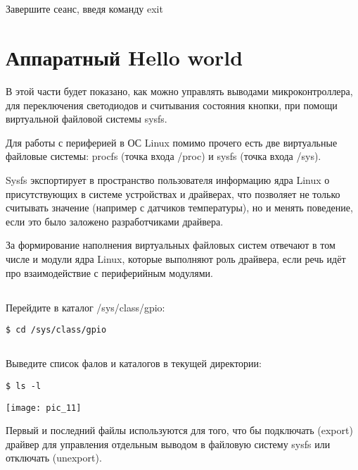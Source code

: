 \subsection{}Завершите сеанс, введя команду exit 

\section{Аппаратный Hello world }

В этой части будет показано, как можно управлять выводами микроконтроллера, для переключения светодиодов и считывания состояния кнопки, при помощи виртуальной файловой системы sysfs.

Для работы с периферией в ОС Linux помимо прочего есть две виртуальные файловые системы: procfs (точка входа /proc) и sysfs (точка входа /sys).  

Sysfs экспортирует в пространство пользователя информацию ядра Linux о присутствующих в системе устройствах и драйверах, что позволяет не только считывать значение (например с датчиков температуры), но и менять поведение, если это было заложено разработчиками драйвера.

За формирование наполнения виртуальных файловых систем отвечают в том числе и модули ядра Linux, которые выполняют роль драйвера, если речь идёт про взаимодействие с периферийным модулями.

\subsection{}Перейдите в каталог /sys/class/gpio:
\begin{lstlisting}[style=bash]
$ cd /sys/class/gpio
\end{lstlisting}

\subsection{}Выведите список фалов и каталогов в текущей директории: 
\begin{lstlisting}[style=bash]
$ ls -l
\end{lstlisting}
\begin{center}
	\texttt{[image: pic\_11]}
\end{center}

Первый и последний файлы используются для того, что бы подключать (export) драйвер для управления отдельным выводом в файловую систему sysfs или отключать (unexport). 

